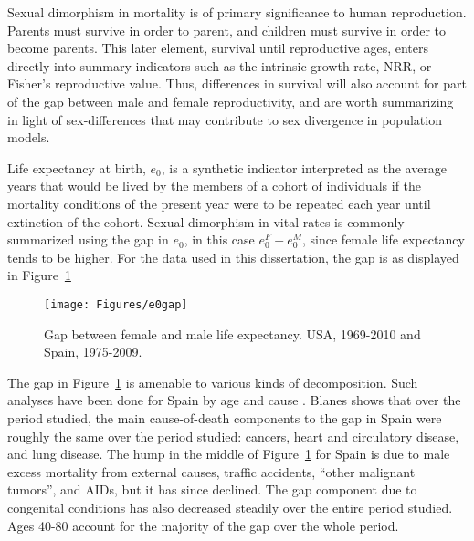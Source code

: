  \FloatBarrier
Sexual dimorphism in mortality is of primary significance to human reproduction.
Parents must survive in order to parent, and children must survive in order to
become parents. This later element, survival until reproductive ages, enters
directly into summary indicators such as the intrinsic growth rate, NRR, or
Fisher's reproductive value. Thus, differences in survival will also account for
part of the gap between male and female reproductivity, and are worth summarizing 
in light of sex-differences
that may contribute to sex divergence in population models.

Life expectancy at birth, $e_0$, is a synthetic indicator interpreted as the
average years that would be lived by the members of a cohort of individuals if
the mortality conditions of the present year were to be repeated each year until extinction of
the cohort. Sexual dimorphism in vital rates is commonly summarized using the
gap in $e_0$, in this case $e_0^F - e_0^M$, since female life expectancy tends
to be higher. For the data used in this dissertation, the gap is as displayed in
Figure~\ref{fig:e0gap}

\begin{figure}[!ht]
  \centering
    \caption{Gap between female and male life expectancy. USA,
    1969-2010 and Spain, 1975-2009.}
     \texttt{[image: Figures/e0gap]}
     \label{fig:e0gap}
\end{figure}

The gap in Figure~\ref{fig:e0gap} is amenable to various kinds of decomposition.
Such analyses have been done for Spain by age and cause \citep[pp 217-218 and
447]{amand2007thesis}. Blanes shows that over the period studied, the main cause-of-death components to the
gap in Spain were roughly the same over the period studied: cancers, heart
and circulatory disease, and lung disease. The hump in the middle of
Figure~\ref{fig:e0gap} for Spain is due to male excess mortality from external
causes, traffic accidents, ``other malignant tumors'', and AIDs, but it has
since declined. The gap component due to congenital conditions has also
decreased steadily over the entire period studied. Ages 40-80 account for the
majority of the gap over the whole period.

